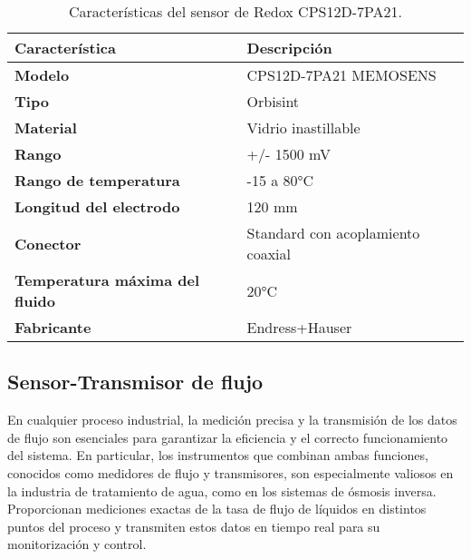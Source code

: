 \begin{table}[H]
    \centering
    \caption{Características del sensor de Redox CPS12D-7PA21.}
    \label{table:sensor_redox}
    \begin{tabular}{| L{6cm} | L{6cm} |}
        \hline
        \textbf{Característica}                & \textbf{Descripción}              \\
        \hline
        \textbf{Modelo}                        & CPS12D-7PA21 MEMOSENS             \\
        \hline
        \textbf{Tipo}                          & Orbisint                          \\
        \hline
        \textbf{Material}                      & Vidrio inastillable               \\
        \hline
        \textbf{Rango}                         & +/- 1500 mV                       \\
        \hline
        \textbf{Rango de temperatura}          & -15 a 80°C                        \\
        \hline
        \textbf{Longitud del electrodo}        & 120 mm                            \\
        \hline
        \textbf{Conector}                      & Standard con acoplamiento coaxial \\
        \hline
        \textbf{Temperatura máxima del fluido} & 20°C                              \\
        \hline
        \textbf{Fabricante}                    & Endress+Hauser                    \\
        \hline
    \end{tabular}
\end{table}


\subsection{Sensor-Transmisor de flujo} \label{sec:sensor_flujo}

En cualquier proceso industrial, la medición precisa y la transmisión de los datos de flujo son esenciales para
garantizar la eficiencia y el correcto funcionamiento del sistema. En particular, los instrumentos que combinan
ambas funciones, conocidos como medidores de flujo y transmisores, son especialmente valiosos en la industria de
tratamiento de agua, como en los sistemas de ósmosis inversa. Proporcionan mediciones exactas de la tasa de flujo de
líquidos en distintos puntos del proceso y transmiten estos datos en tiempo real para su monitorización y control.

